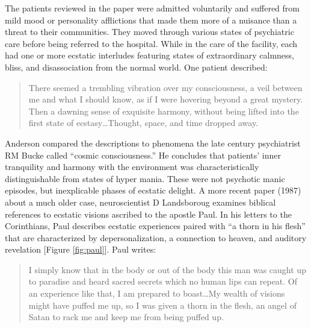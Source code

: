 \documentclass{UIdahoMastersThesis}
\begin{document}
The patients reviewed in the paper were admitted voluntarily and suffered from mild mood or personality afflictions that made them more of a nuisance than a threat to their communities. They moved through various states of psychiatric care before being referred to the hospital. While in the care of the facility, each had one or more ecstatic interludes featuring states of extraordinary calmness, bliss, and disassociation from the normal world. One patient described:

\begin{quote}
{There seemed a trembling vibration over my consciousness, a veil between me and what I should know, as if I were hovering beyond a great mystery. Then a dawning sense of exquisite harmony, without being lifted into the first state of ecstasy\ldots Thought, space, and time dropped away.}
\end{quote}
  
Anderson compared the descriptions to phenomena the late  century psychiatrist RM Bucke called ``cosmic consciousness.'' He concludes that patients' inner tranquility and harmony with the environment was characteristically distinguishable from states of hyper mania. These were not psychotic manic episodes, but inexplicable phases of ecstatic delight.
A more recent paper (1987) about a much older case, neuroscientist D Landsboroug examines biblical references to ecstatic visions ascribed to the apostle Paul. In his letters to the Corinthians, Paul describes ecstatic experiences paired with ``a thorn in his flesh'' that are characterized by depersonalization, a connection to heaven, and auditory revelation [Figure \ref{fig:paul}]. Paul writes:

\begin{quote}
{I simply know that in the body or out of the body this man was caught up to paradise and heard sacred secrets which no human lips can repeat. Of an experience like that, I am prepared to boast\ldots My wealth of visions might have puffed me up, so I was given a thorn in the flesh, an angel of Satan to rack me and keep me from being puffed up.}\cite{bible_new_1984}
\end{quote}
\end{document}
